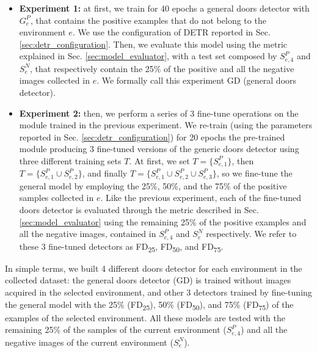 \begin{itemize}
	\item \textbf{Experiment 1:} at first, we train for 40 epochs a general doors detector with $G^{P}_e$, that contains the positive examples that do not belong to the environment $e$. We use the configuration of DETR reported in Sec. \ref{sec:detr_configuration}. Then, we evaluate this model using the metric explained in Sec. \ref{sec:model_evaluator}, with a test set composed by $S^{P}_{e, 4}$ and $S^{N}_e$, that respectively contain the 25\% of the positive and all the negative images collected in $e$. We formally call this experiment \textsf{GD} (general doors detector). 
	
	\item \textbf{Experiment 2:} then, we perform a series of 3 fine-tune operations on the module trained in the previous experiment. We re-train (using the parameters reported in Sec. \ref{sec:detr_configuration}) for 20 epochs  the pre-trained module producing 3 fine-tuned versions of the generic doors detector using three different training sets $T$. At first, we set $ T= \big\{S^{P}_{e, 1}\big\}$, then $T=\big\{S^{P}_{e, 1} \cup S^{P}_{e, 2}\big\}$, and finally $T=\big\{S^{P}_{e, 1} \cup S^{P}_{e, 2} \cup S^{P}_{e, 3}\big\}$, so we fine-tune the general model by employing the  25\%, 50\%, and the 75\% of the positive samples collected in $e$. Like the previous experiment, each of the fine-tuned doors detector is evaluated through the metric described in Sec. \ref{sec:model_evaluator} using the remaining 25\% of the positive examples and all the negative images, contained in $S^{P}_{e, 4}$ and $S^{N}_e$ respectively. We refer to these 3 fine-tuned detectors as \textsf{FD\textsubscript{25}}, \textsf{FD\textsubscript{50}}, and \textsf{FD\textsubscript{75}}. 

\end{itemize}

In simple terms, we built 4 different doors detector for each environment in the collected dataset: the general doors detector (\textsf{GD}) is trained without images acquired in the selected environment, and other 3 detectors trained by fine-tuning the general model with the 25\% (\textsf{FD\textsubscript{25}}), 50\% (\textsf{FD\textsubscript{50}}), and 75\% (\textsf{FD\textsubscript{75}}) of the examples of the selected environment. All these models are tested with the remaining 25\% of the samples of the current environment ($S^{P}_{e,4}$) and all the negative images of the current environment ($S^{N}_{e}$).

